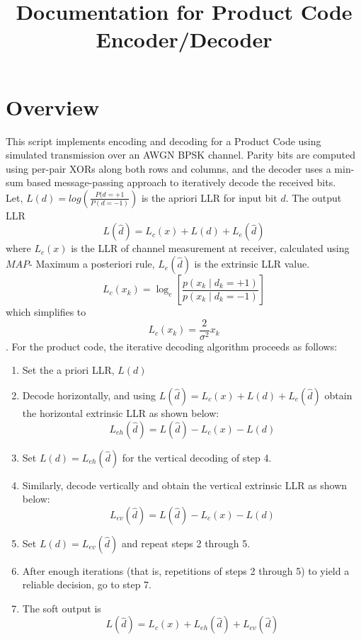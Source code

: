 \documentclass[12pt]{amsart}
\title{Documentation for Product Code Encoder/Decoder}
\author{}
\date{}
\theoremstyle{plain}
\theoremstyle{definition}
\theoremstyle{remark}
\begin{document}
\vspace*{-3em}
\maketitle

\section{Overview}

This script implements encoding and decoding for a Product Code using simulated transmission over an AWGN BPSK channel. Parity bits are computed using per-pair XORs along both rows and columns, and the decoder uses a min-sum based message-passing approach to iteratively decode the received bits.\\

Let, $L(d)=log(\frac{P(d=+1}{P(d=-1)})$ is the apriori LLR for input bit $d$. The output LLR $$L(\hat{d})=L_c(x)+L(d)+L_e(\hat{d})$$ where $L_c(x)$ is the LLR of channel measurement at receiver, calculated using $MAP$- Maximum a posteriori rule, $L_e(\hat{d})$ is the extrinsic LLR value.\\
\[
L_c(x_k) = \log_e \left[ \frac{p(x_k \mid d_k = +1)}{p(x_k \mid d_k = -1)} \right]
\]
which simplifies to $$L_c(x_k)=\frac{2}{\sigma^2}x_k$$.
For the product code, the iterative decoding algorithm proceeds as follows:

\begin{enumerate}
    \item Set the a priori LLR, $L(d)$
    
    \item Decode horizontally, and using $
L(\hat{d}) = L_c(x) + L(d) + L_e(\hat{d})$
 obtain the horizontal extrinsic LLR as shown below:
    \[
    L_{eh}(\hat{d}) = L(\hat{d}) - L_c(x) - L(d)
    \]
    
    \item Set \( L(d) = L_{eh}(\hat{d}) \) for the vertical decoding of step 4.
    
    \item Similarly, decode vertically and obtain the vertical extrinsic LLR as shown below:
    \[
    L_{ev}(\hat{d}) = L(\hat{d}) - L_c(x) - L(d)
    \]
    
    \item Set \( L(d) = L_{ev}(\hat{d}) \) and repeat steps 2 through 5.
    
    \item After enough iterations (that is, repetitions of steps 2 through 5) to yield a reliable decision, go to step 7.
    
    \item The soft output is
    \[
    L(\hat{d}) = L_c(x) + L_{eh}(\hat{d}) + L_{ev}(\hat{d})
    \]\\
\end{enumerate}
\end{document}
